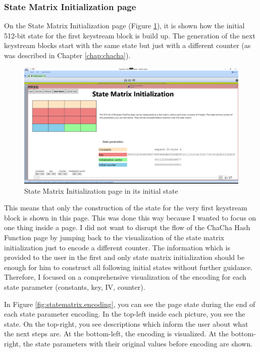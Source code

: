 \subsubsection{State Matrix Initialization page}

On the State Matrix Initialization page (Figure \ref{fig:statematrixpage}), it is shown how the initial 512-bit state for the first keystream block is build up. The generation of the next keystream blocks start with the same state but just with a different counter (as was described in Chapter \ref{chap:chacha}).

\begin{figure}
\centering
\includegraphics[width=\textwidth]{figures/ct2/all-pages/4-statematrix.png}
\caption{State Matrix Initialization page in its initial state}
\label{fig:statematrixpage}
\end{figure}

This means that only the construction of the state for the very first keystream block is shown in this page. This was done this way because I wanted to focus on one thing inside a page. I did not want to disrupt the flow of the ChaCha Hash Function page by jumping back to the visualization of the state matrix initialization just to encode a different counter. The information which is provided to the user in the first and only state matrix initialization should be enough for him to construct all following initial states without further guidance. Therefore, I focused on a comprehensive visualization of the encoding for each state parameter (constants, key, IV, counter). 

In Figure \ref{fig:statematrix.encoding}, you can see the page state during the end of each state parameter encoding. In the top-left inside each picture, you see the state. On the top-right, you see descriptions which inform the user about what the next steps are. At the bottom-left, the encoding is visualized. At the bottom-right, the state parameters with their original values before encoding are shown.

